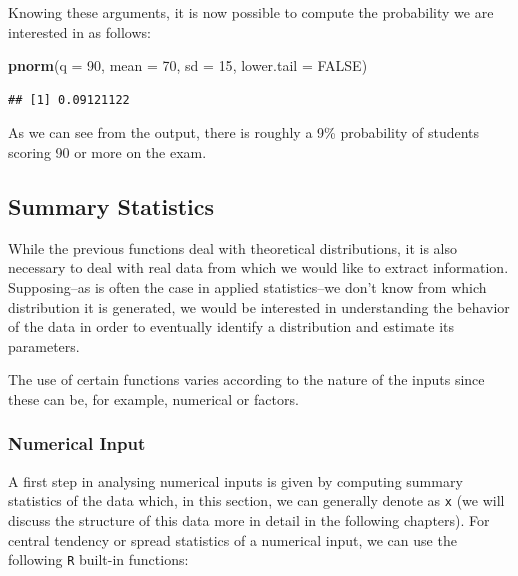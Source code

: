 \documentclass[12pt,]{krantz}
\newenvironment{Shaded}{\begin{snugshade}}{\end{snugshade}}
\newcommand{\KeywordTok}[1]{\textcolor[rgb]{0.27,0.27,0.27}{\textbf{#1}}}
\newcommand{\DataTypeTok}[1]{\textcolor[rgb]{0.27,0.27,0.27}{#1}}
\newcommand{\DecValTok}[1]{\textcolor[rgb]{0.06,0.06,0.06}{#1}}
\newcommand{\OtherTok}[1]{\textcolor[rgb]{0.37,0.37,0.37}{#1}}
\newcommand{\NormalTok}[1]{#1}
\begin{document}
Knowing these arguments, it is now possible to compute the probability
we are interested in as follows:

\begin{Shaded}
\begin{Highlighting}[]
\KeywordTok{pnorm}\NormalTok{(}\DataTypeTok{q =} \DecValTok{90}\NormalTok{, }\DataTypeTok{mean =} \DecValTok{70}\NormalTok{, }\DataTypeTok{sd =} \DecValTok{15}\NormalTok{, }\DataTypeTok{lower.tail =} \OtherTok{FALSE}\NormalTok{) }
\end{Highlighting}
\end{Shaded}

\begin{verbatim}
## [1] 0.09121122
\end{verbatim}

As we can see from the output, there is roughly a 9\% probability of
students scoring 90 or more on the exam.

\subsection{Summary Statistics}\label{summary-statistics}

While the previous functions deal with theoretical distributions, it is
also necessary to deal with real data from which we would like to
extract information. Supposing--as is often the case in applied
statistics--we don't know from which distribution it is generated, we
would be interested in understanding the behavior of the data in order
to eventually identify a distribution and estimate its parameters.

The use of certain functions varies according to the nature of the
inputs since these can be, for example, numerical or factors.

\subsubsection{Numerical Input}\label{numerical-input}

A first step in analysing numerical inputs is given by computing summary
statistics of the data which, in this section, we can generally denote
as \texttt{x} (we will discuss the structure of this data more in detail
in the following chapters). For central tendency or spread statistics of
a numerical input, we can use the following \texttt{R} built-in
functions:
\end{document}
